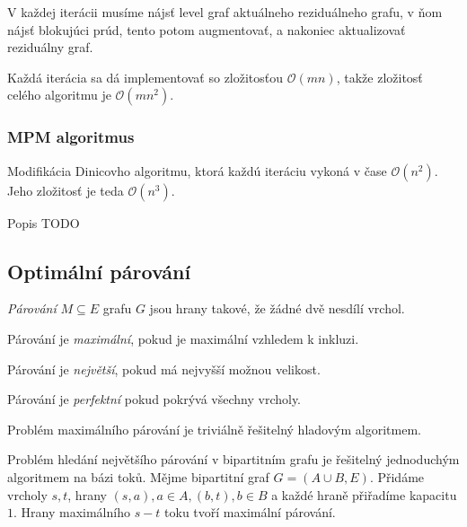 V každej iterácii musíme nájsť level graf aktuálneho reziduálneho grafu,
v ňom nájsť blokujúci prúd, tento potom augmentovať, a nakoniec 
aktualizovať reziduálny graf.

Každá iterácia sa dá implementovať so zložitosťou $\mathcal{O}(mn)$, takže
zložitosť celého algoritmu je $\mathcal{O}(mn^2)$.

\subsubsection{MPM algoritmus}
Modifikácia Dinicovho algoritmu, ktorá každú iteráciu vykoná v čase $\mathcal{O}(n^2)$.
Jeho zložitosť je teda $\mathcal{O}(n^3)$.

Popis TODO

\subsection{Optimální párování}


\begin{definition}
    {\em Párování} $M \subseteq E$ grafu $G$ jsou hrany takové, že
    žádné dvě nesdílí vrchol.

    Párování je {\em maximální}, pokud je maximální vzhledem k inkluzi.

    Párování je {\em největší}, pokud má nejvyšší možnou velikost.

    Párování je {\em perfektní} pokud pokrývá všechny vrcholy.
\end{definition}

Problém maximálního párování je triviálně řešitelný hladovým
algoritmem.

Problém hledání největšího párování v bipartitním grafu je řešitelný
jednoduchým algoritmem na bázi toků. Mějme bipartitní graf
$G = (A \cup B, E)$. Přidáme vrcholy $s, t$,
hrany $(s, a), a \in A, (b, t), b \in B$ a každé hraně přiřadíme
kapacitu $1$. Hrany maximálního $s-t$ toku tvoří maximální párování.


